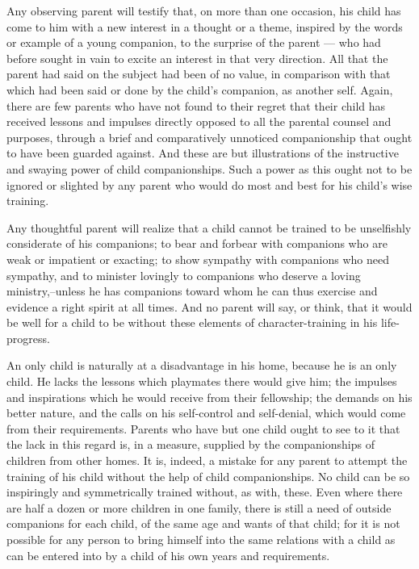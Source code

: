 \documentclass[
]{book}
\begin{document}
Any observing parent will testify that, on more than one occasion, his child has come to him with a new interest in a thought or a theme, inspired by the words or example of a young companion, to the surprise of the parent --- who had before sought in vain to excite an interest in that very direction. All that the parent had said on the subject had been of no value, in comparison with that which had been said or done by the child's companion, as another self. Again, there are few parents who have not found to their regret that their child has received lessons and impulses directly opposed to all the parental counsel and purposes, through a brief and comparatively unnoticed companionship that ought to have been guarded against. And these are but illustrations of the instructive and swaying power of child companionships. Such a power as this ought not to be ignored or slighted by any parent who would do most and best for his child's wise training.

Any thoughtful parent will realize that a child cannot be trained to be unselfishly considerate of his companions; to bear and forbear with companions who are weak or impatient or exacting; to show sympathy with companions who need sympathy, and to minister lovingly to companions who deserve a loving ministry,--unless he has companions toward whom he can thus exercise and evidence a right spirit at all times. And no parent will say, or think, that it would be well for a child to be without these elements of character-training in his life-progress.

An only child is naturally at a disadvantage in his home, because he is an only child. He lacks the lessons which playmates there would give him; the impulses and inspirations which he would receive from their fellowship; the demands on his better nature, and the calls on his self-control and self-denial, which would come from their requirements. Parents who have but one child ought to see to it that the lack in this regard is, in a measure, supplied by the companionships of children from other homes. It is, indeed, a mistake for any parent to attempt the training of his child without the help of child companionships. No child can be so inspiringly and symmetrically trained without, as with, these. Even where there are half a dozen or more children in one family, there is still a need of outside companions for each child, of the same age and wants of that child; for it is not possible for any person to bring himself into the same relations with a child as can be entered into by a child of his own years and requirements.
\end{document}
